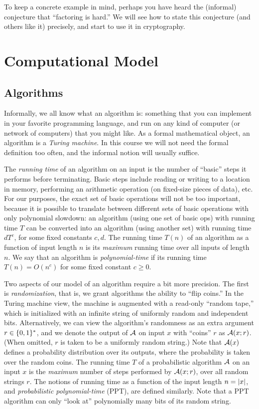 \documentclass[11pt]{article}
\begin{document}
To keep a concrete example in mind, perhaps you have heard the
(informal) conjecture that ``factoring is hard.''  We will see how to
state this conjecture (and others like it) precisely, and start to use
it in cryptography.

\section{Computational Model}
\label{sec:computational-model}

\subsection{Algorithms}
\label{sec:algorithms}

Informally, we all know what an algorithm is: something that you can
implement in your favorite programming language, and run on any kind
of computer (or network of computers) that you might like.  As a
formal mathematical object, an algorithm is a \emph{Turing machine}.
In this course we will not need the formal definition too often, and
the informal notion will usually suffice.

The \emph{running time} of an algorithm on an input is the number of
``basic'' steps it performs before terminating.  Basic steps include
reading or writing to a location in memory, performing an arithmetic
operation (on fixed-size pieces of data), etc.  For our purposes, the
exact set of basic operations will not be too important, because it is
possible to translate between different sets of basic operations with
only polynomial slowdown: an algorithm (using one set of basic ops)
with running time $T$ can be converted into an algorithm (using
another set) with running time $d T^{c}$, for some fixed constants
$c,d$.  The running time $T(n)$ of an algorithm as a function of input
length $n$ is its \emph{maximum} running time over all inputs of
length $n$.  We say that an algorithm is \emph{polynomial-time} if its
running time $T(n)=O(n^{c})$ for some fixed constant $c \geq 0$.

Two aspects of our model of an algorithm require a bit more precision.
The first is \emph{randomization}, that is, we grant algorithms the
ability to ``flip coins.''  In the Turing machine view, the machine is
augmented with a read-only ``random tape,'' which is initialized with
an infinite string of uniformly random and independent bits.
Alternatively, we can view the algorithm's randomness as an extra
argument $r \in \{0,1\}^{*}$, and we denote the output of $\mathcal{A}$ on input
$x$ with ``coins'' $r$ as $\mathcal{A}(x; r)$.  (When omitted, $r$ is taken
to be a uniformly random string.)  Note that $\mathcal{A}(x)$ defines a
probability distribution over its outputs, where the probability is
taken over the random coins.  The running time $T$ of a probabilistic
algorithm $\mathcal{A}$ on an input $x$ is the \emph{maximum} number of steps
performed by $\mathcal{A}(x;r)$, over all random strings $r$.  The notions of
running time as a function of the input length $n = \lvert x\rvert$, and
\emph{probabilistic polynomial-time} (PPT), are defined similarly.
Note that a PPT algorithm can only ``look at'' polynomially many bits
of its random string.
\end{document}
